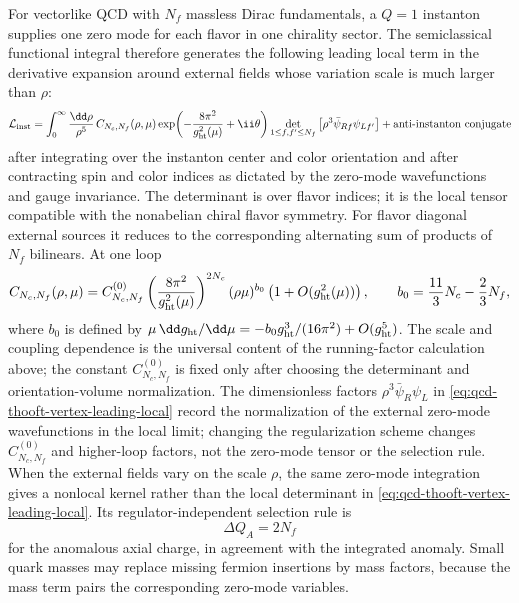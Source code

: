 For vectorlike QCD with \(N_f\) massless Dirac fundamentals, a \(Q=1\)
instanton supplies one zero mode for each flavor in one chirality sector.  The
semiclassical functional integral therefore generates the following leading
local term in the derivative expansion around external fields whose variation
scale is much larger than \(\rho\):
\begin{equation}
  \mathcal L_{\rm inst}
  =
  \int_0^\infty\frac{\dd\rho}{\rho^5}\,
  C_{N_c,N_f}(\rho,\mu)
  \exp\!\left(-\frac{8\pi^2}{g_{\rm ht}^2(\mu)}+\ii\theta\right)
  \det_{1\le f,f'\le N_f}
  \left[
    \rho^3\bar\psi_{R f}\psi_{L f'}
  \right]
  +\hbox{anti-instanton conjugate}
  \label{eq:qcd-thooft-vertex-leading-local}
\end{equation}
after integrating over the instanton center and color orientation and after
contracting spin and color indices as dictated by the zero-mode wavefunctions
and gauge invariance.  The determinant is over flavor indices; it is the local
tensor compatible with the nonabelian chiral flavor symmetry.  For flavor
diagonal external sources it reduces to the corresponding alternating sum of
products of \(N_f\) bilinears.  At one loop
\[
  C_{N_c,N_f}(\rho,\mu)
  =
  C^{(0)}_{N_c,N_f}
  \left(\frac{8\pi^2}{g_{\rm ht}^2(\mu)}\right)^{2N_c}
  (\rho\mu)^{b_0}
  \left(1+O(g_{\rm ht}^2(\mu))\right),
  \qquad
  b_0=\frac{11}{3}N_c-\frac23N_f,
\]
where \(b_0\) is defined by
\(\mu\,\dd g_{\rm ht}/\dd\mu=-b_0g_{\rm ht}^3/(16\pi^2)+O(g_{\rm ht}^5)\).
The scale and coupling dependence is the universal content of the running-factor
calculation above; the constant
\(C^{(0)}_{N_c,N_f}\) is fixed only after choosing the determinant and
orientation-volume normalization.  The dimensionless factors
\(\rho^3\bar\psi_R\psi_L\) in
\eqref{eq:qcd-thooft-vertex-leading-local} record the normalization of the
external zero-mode wavefunctions in the local limit; changing the
regularization scheme changes \(C^{(0)}_{N_c,N_f}\) and higher-loop factors,
not the zero-mode tensor or the selection rule.  When the external fields vary
on the scale \(\rho\), the same zero-mode integration gives a nonlocal kernel
rather than the local determinant in
\eqref{eq:qcd-thooft-vertex-leading-local}.  Its regulator-independent
selection rule is
\[
  \Delta Q_A=2N_f
\]
for the anomalous axial charge, in agreement with the integrated anomaly.
Small quark masses may replace missing fermion insertions by mass factors,
because the mass term pairs the corresponding zero-mode variables.

